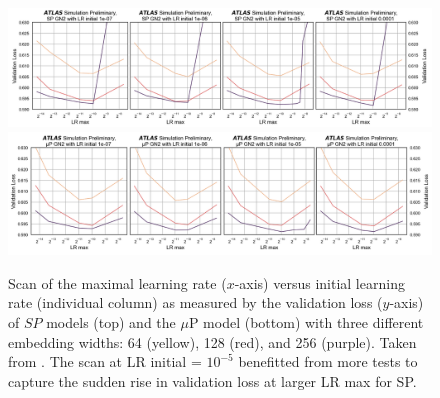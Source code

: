 \begin{figure}[h!]
  \centering
  \includegraphics[width=\textwidth]{Images/FTAG/GN/HPO/fullSP2.png}\\
  \includegraphics[width=\textwidth]{Images/FTAG/GN/HPO/fullmup2.png}
  \caption{Scan of the maximal learning rate ($x$-axis) versus initial learning rate (individual column) as measured by the validation loss ($y$-axis) of $SP$ models (top) and the $\mu$P model (bottom) with three different embedding widths: 64 (yellow), 128 (red), and 256 (purple). Taken from \cite{publicplotMUP}. The scan at LR initial = $10^{-5}$ benefitted from more tests to capture the sudden rise in validation loss at larger LR max for SP.}
  \label{fig:fullSPmup}
\end{figure} 

